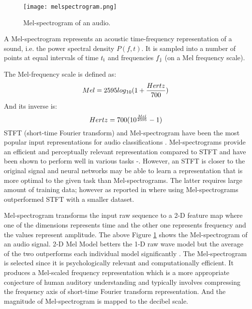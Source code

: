 \documentclass[a4paper]{article}
\begin{document}
\begin{figure}[t] 
  \centering
  \texttt{[image: melspectrogram.png]}
  \caption{Mel-spectrogram of an audio.}
  \label{fig:melspectrogram}
\end{figure}

    A Mel-spectrogram represents an acoustic time-frequency representation of a sound, i.e. the power spectral density $P(f, t)$. It is sampled into a number of points at equal intervals of time $t\textsubscript{i}$ and frequencies $f\textsubscript{j}$ (on a Mel frequency scale).
    
    The Mel-frequency scale is defined as:
        \begin{equation}
            Mel = 2595 log\textsubscript{10}(1 + \frac{Hertz}{700})
        \end{equation}
    And its inverse is:
    	\begin{equation}
            Hertz = 700 (10\textsuperscript{$\frac{Mel}{2595}$} - 1)
        \end{equation}
STFT (short-time Fourier transform) and Mel-spectrogram have been the most popular input representations for audio classifications \cite{melref}. Mel-spectrograms provide an efficient and perceptually relevant representation compared to STFT \cite{hearref} and have been shown to perform well in various tasks \cite{melperf1}-\cite{melperf5}. However, an STFT is closer to the original signal and neural networks may be able to learn a representation that is more optimal to the given task than Mel-spectrograms. The latter requires large amount of training data; however as reported in \cite{melexp}  where using Mel-spectrograms outperformed STFT with a smaller dataset.


   Mel-spectrogram transforms the input raw sequence to a 2-D feature map where one of the dimensions represents time and the other one represents frequency and the values represent amplitude. The above Figure \ref{fig:melspectrogram} shows the Mel-spectrogram of an audio signal. 2-D Mel Model betters the 1-D raw wave model but the average of the two outperforms each individual model significantly \cite{1d2d}. The Mel-spectrogram is selected since it is psychologically relevant and computationally efficient. It produces a Mel-scaled frequency representation which is a more appropriate conjecture of human auditory understanding \cite{hearref} and typically involves compressing the frequency axis of short-time Fourier transform representation. And the magnitude of Mel-spectrogram is mapped to the decibel scale.
\end{document}
